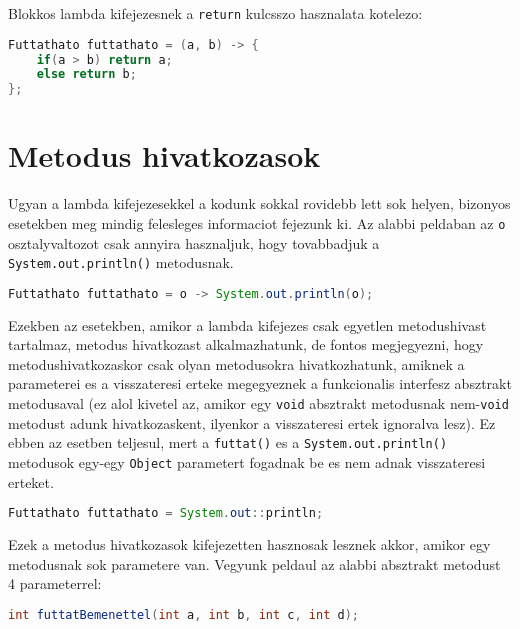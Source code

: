 \documentclass{article}
\let\l\lstinline
\begin{document}
Blokkos lambda kifejezesnek a \l{return} kulcsszo hasznalata kotelezo:

\begin{lstlisting}[language=Java, caption=Nem void absztrakt metodus implementalasa lambda kifejezessel]
Futtathato futtathato = (a, b) -> {
	if(a > b) return a;
	else return b;
};
\end{lstlisting}
\newpage

\section{Metodus hivatkozasok}

Ugyan a lambda kifejezesekkel a kodunk sokkal rovidebb lett sok helyen, bizonyos esetekben meg mindig felesleges informaciot fejezunk ki. Az alabbi peldaban az \l{o} osztalyvaltozot csak annyira hasznaljuk, hogy tovabbadjuk a \l{System.out.println()} metodusnak.

\begin{lstlisting}[language=Java, caption=Parameteres absztrakt metodus implementalasa lambda kifejezessel]
Futtathato futtathato = o -> System.out.println(o);
\end{lstlisting}

Ezekben az esetekben, amikor a lambda kifejezes csak egyetlen metodushivast tartalmaz, metodus hivatkozast alkalmazhatunk, de fontos megjegyezni, hogy metodushivatkozaskor csak olyan metodusokra hivatkozhatunk, amiknek a parameterei es a visszateresi erteke megegyeznek a funkcionalis interfesz absztrakt metodusaval (ez alol kivetel az, amikor egy \l{void} absztrakt metodusnak nem-\l{void} metodust adunk hivatkozaskent, ilyenkor a visszateresi ertek ignoralva lesz). Ez ebben az esetben teljesul, mert a \l{futtat()} es a \l{System.out.println()} metodusok egy-egy \l{Object} parametert fogadnak be es nem adnak visszateresi erteket.

\begin{lstlisting}[language=Java, caption=Metodus hivatkozas]
Futtathato futtathato = System.out::println;
\end{lstlisting}

Ezek a metodus hivatkozasok kifejezetten hasznosak lesznek akkor, amikor egy metodusnak sok parametere van. Vegyunk peldaul az alabbi absztrakt metodust 4 parameterrel:

\begin{lstlisting}[language=Java, caption=Absztrakt metodus 4 parameterrel]
int futtatBemenettel(int a, int b, int c, int d);
\end{lstlisting}
\end{document}
